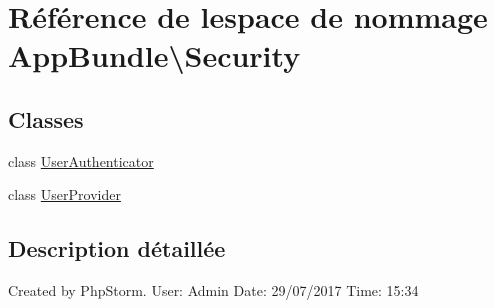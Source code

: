 \hypertarget{namespaceAppBundle_1_1Security}{}\section{Référence de l\textquotesingle{}espace de nommage App\+Bundle\textbackslash{}Security}
\label{namespaceAppBundle_1_1Security}
\subsection*{Classes}
\begin{DoxyCompactItemize}
\item 
class \hyperlink{classAppBundle_1_1Security_1_1UserAuthenticator}{User\+Authenticator}
\item 
class \hyperlink{classAppBundle_1_1Security_1_1UserProvider}{User\+Provider}
\end{DoxyCompactItemize}


\subsection{Description détaillée}
Created by Php\+Storm. User\+: Admin Date\+: 29/07/2017 Time\+: 15\+:34 